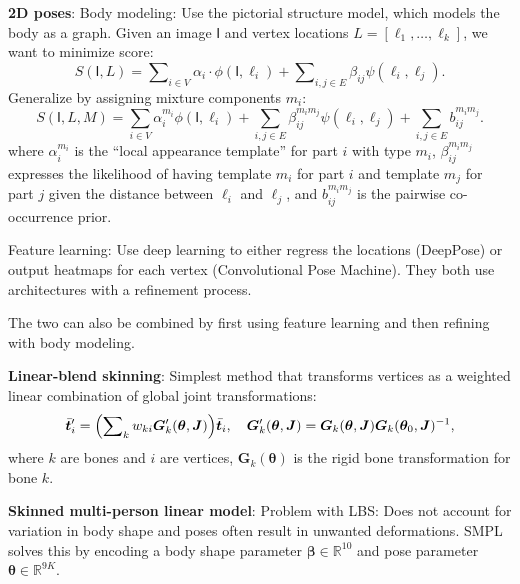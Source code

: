 \documentclass{article}
\newcommand{\lft}{\mathopen{}\mathclose\bgroup\left}
\newcommand{\rgt}{\aftergroup\egroup\right}
\newcommand{\R}{\mathbb{R}}
\renewcommand{\vec}[1]{\bm{#1}}
\newcommand{\mat}[1]{\bm{#1}}
\newcommand{\tens}[1]{\bm{\mathsf{#1}}}
\newenvironment{topic}[1]
{\textbf{\sffamily \colorbox{black}{\rlap{\textbf{\textcolor{white}{#1}}}\hspace{\linewidth}\hspace{-2\fboxsep}}} \\ \vspace{0.2cm}}
{}
\begin{document}
\begin{multicols*}{2}
\begin{topic}{Implicit surfaces and neural radiance fields}
    \end{topic}

    \begin{topic}{Parametric human body models}
        \textbf{2D poses}: Body modeling: Use the pictorial structure model, which models the body
        as a graph. Given an image $\tens{I}$ and vertex locations $L = [\ell_1, \ldots, \ell_k]$, we want
        to minimize score: \[
            S(\tens{I}, L) = \sum\nolimits_{i\in V} \alpha_i \cdot \phi(\tens{I}, \ell_i) + \sum\nolimits_{i,j \in E} \beta_{ij} \psi(\ell_i, \ell_j).
        \]
        Generalize by assigning mixture components $m_i$: \[
            S(\tens{I}, L, M) = \sum_{i\in V} \alpha_i^{m_i} \phi(\tens{I}, \ell_i) + \sum_{i,j \in E} \beta_{ij}^{m_im_j} \psi(\ell_i,\ell_j) + \sum_{i,j \in E} b_{ij}^{m_im_j}.
        \]
        where $\alpha^{m_i}_i$ is the ``local appearance template'' for part $i$ with type $m_i$,
        $\beta^{m_im_j}_{ij}$ expresses the likelihood of having template $m_i$ for part $i$ and template
        $m_j$ for part $j$ given the distance between $\ell_i$ and $\ell_j$, and $b_{ij}^{m_im_j}$ is the
        pairwise co-occurrence prior.

        Feature learning: Use deep learning to either regress the locations (DeepPose) or output heatmaps
        for each vertex (Convolutional Pose Machine). They both use architectures with a refinement
        process.

        The two can also be combined by first using feature learning and then refining with body modeling.

        \textbf{Linear-blend skinning}: Simplest method that transforms vertices as a weighted linear combination of global joint transformations: \[
            \bar{\vec{t}}_i' = \lft( \sum\nolimits_{k} w_{ki} \mat{G}'_k(\vec{\theta}, \mat{J}) \rgt) \bar{\vec{t}}_i, \quad \mat{G}'_k(\vec{\theta}, \mat{J}) = \mat{G}_k(\vec{\theta}, \mat{J}) \mat{G}_k(\vec{\theta}_0, \mat{J})^{-1},
        \]
        where $k$ are bones and $i$ are vertices, $\mat{G}_k(\vec{\theta})$ is the rigid bone
        transformation for bone $k$. %

        \textbf{Skinned multi-person linear model}: Problem with LBS: Does not account for variation
        in body shape and poses often result in unwanted deformations. SMPL solves this by encoding a
        body shape parameter $\vec{\beta} \in \R^{10}$ and pose parameter $\vec{\theta} \in \R^{9K}$.


\end{topic}
\end{multicols*}
\end{document}
